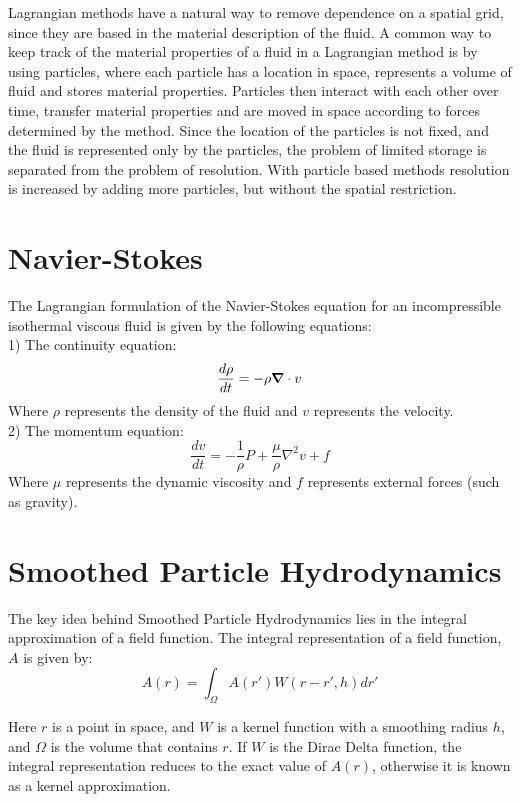Lagrangian methods have a natural way to remove dependence on a spatial grid,
since they are based in the material description of the fluid. A common way to
keep track of the material properties of a fluid in a Lagrangian method is by
using particles, where each particle has a location in space, represents a
volume of fluid and stores material properties. Particles then interact with
each other over time, transfer material properties and are moved in space
according to forces determined by the method. Since the location of the
particles is not fixed, and the fluid is represented only by the particles, the
problem of limited storage is separated from the problem of resolution. With
particle based methods resolution is increased by adding more particles, but
without the spatial restriction.



\section{Navier-Stokes}

The Lagrangian formulation of the Navier-Stokes equation for an incompressible
isothermal viscous fluid is given by the following equations: \\
1) The continuity equation:
$$
\frac{d\rho}{dt} = -\rho \mbox{\boldmath$ \nabla $} \cdot v
$$
Where $\rho$ represents the density of the fluid and $v$ represents the velocity.\\


2) The momentum equation:
$$
\frac{dv}{dt} = -\frac{1}{\rho}P + \frac{\mu}{\rho} \nabla^2 v + f
$$
Where $\mu$ represents the dynamic viscosity and $f$ represents external forces (such as gravity).


\section{Smoothed Particle Hydrodynamics}


The key idea behind Smoothed Particle Hydrodynamics lies in the integral
approximation of a field function. \cite{Monaghan2005}
The integral representation of a field
function, $A$ is given by: 
$$
A(r) = \int_\Omega A(r')W(r-r', h)dr'
$$

Here $r$ is a point in space, and $W$ is a kernel function with a smoothing radius
$h$, and $\Omega$ is the volume that contains $r$. If $W$ is the Dirac Delta
function, the integral representation reduces to the exact value of $A(r)$,
otherwise it is known as a kernel approximation.

